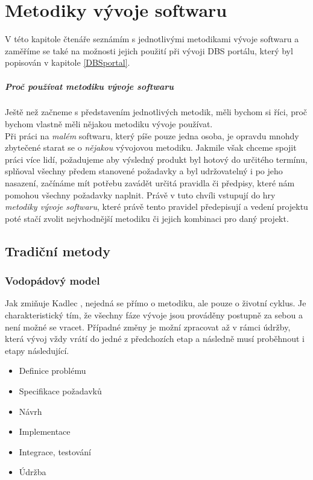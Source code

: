 \chapter{Metodiky vývoje softwaru} \label{methods}

V této kapitole čtenáře seznámím s jednotlivými metodikami vývoje softwaru a zaměříme se také na možnosti jejich použití při vývoji DBS portálu, který byl popisován v kapitole \ref{DBSportal}.	

\paragraph{Proč používat metodiku vývoje softwaru}
Ještě než začneme s představením jednotlivých metodik, měli bychom si říci, proč bychom vlastně měli nějakou metodiku vývoje používat.\\
Při práci na \emph{malém} softwaru, který píše pouze jedna osoba, je opravdu mnohdy zbytečené starat se o \emph{nějakou} vývojovou metodiku. Jakmile však chceme spojit práci více lidí, požadujeme aby výsledný produkt byl hotový do určitého termínu, splňoval všechny předem stanovené požadavky a byl udržovatelný i po jeho nasazení, začínáme mít potřebu zavádět určitá pravidla či předpisy, které nám pomohou všechny požadavky naplnit. Právě v tuto chvíli vstupují do hry \emph{metodiky vývoje softwaru}, které právě tento  pravidel předepisují a vedení projektu poté stačí zvolit nejvhodnější metodiku či jejich kombinaci pro daný projekt.

\section{Tradiční metody} \label{methods:traditional}

\subsection{Vodopádový model} \label{methods:waterfall}

Jak zmiňuje Kadlec \cite{kadlec}, nejedná se přímo o metodiku, ale pouze o životní cyklus. Je charakteristický tím, že všechny fáze vývoje jsou prováděny postupně za sebou a není možné se vracet. Případné změny je možní zpracovat až v rámci údržby, která vývoj vždy vrátí do jedné z předchozích etap a následně musí proběhnout i etapy následující.

\begin{itemize}
	\item Definice problému
	\item Specifikace požadavků
	\item Návrh
	\item Implementace
	\item Integrace, testování
	\item Údržba
\end{itemize}


